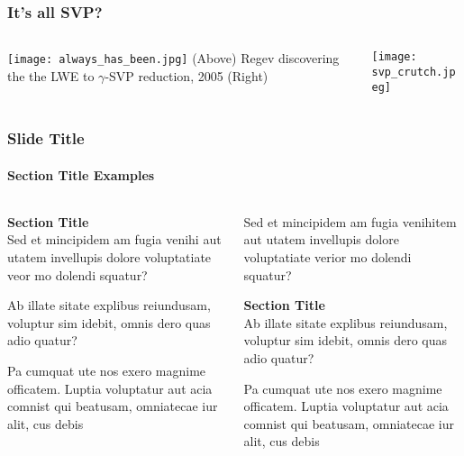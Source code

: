 \documentclass[
aspectratio=169, %
t, %
onlytextwidth, %
10pt, %
]{beamer}
\begin{document}

\begin{frame}
    \frametitle{It's all SVP?}

    \begin{columns}[T] %
        \begin{column}{0.48\linewidth} %
            \texttt{[image: always\_has\_been.jpg]} %
            {\tiny\textcolor{ICLBlue}{(Above) Regev discovering the the LWE to $\gamma$-SVP reduction, 2005}}
            {\tiny\textcolor{ICLBlue}{(Right) }}
        \end{column}
        \begin{column}{0.48\linewidth} %
            \texttt{[image: svp\_crutch.jpeg]} %
        \end{column}
    \end{columns}
\end{frame}


\begin{frame}
    \frametitle{Slide Title}
    \framesubtitle{Section Title Examples}

    \begin{columns}[T] %
        \begin{column}{0.48\linewidth} %
            \textbf{Section Title}\\
            Sed et mincipidem am fugia venihi aut utatem invellupis dolore voluptatiate veor mo dolendi squatur?

            Ab illate sitate explibus reiundusam, voluptur sim idebit, omnis dero quas adio quatur?

            Pa cumquat ute nos exero magnime officatem. Luptia voluptatur aut acia comnist qui beatusam, omniatecae iur alit, cus debis
        \end{column}
        \begin{column}{0.48\linewidth} %
            Sed et mincipidem am fugia venihitem aut utatem invellupis dolore voluptatiate verior mo dolendi squatur?

            \textbf{Section Title}\\
            Ab illate sitate explibus reiundusam, voluptur sim idebit, omnis dero quas adio quatur?

            Pa cumquat ute nos exero magnime officatem. Luptia voluptatur aut acia comnist qui beatusam, omniatecae iur alit, cus debis
        \end{column}
    \end{columns}
\end{frame}
\end{document}
